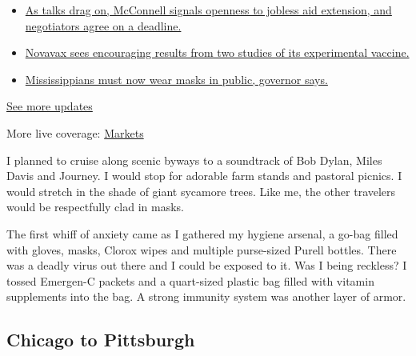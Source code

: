 \begin{itemize}
\tightlist
\item
  \href{https://www.nytimes.com/2020/08/04/world/coronavirus-cases.html?action=click\&pgtype=Article\&state=default\&region=MAIN_CONTENT_1\&context=storylines_live_updates\#link-762df92}{As
  talks drag on, McConnell signals openness to jobless aid extension,
  and negotiators agree on a deadline.}
\item
  \href{https://www.nytimes.com/2020/08/04/world/coronavirus-cases.html?action=click\&pgtype=Article\&state=default\&region=MAIN_CONTENT_1\&context=storylines_live_updates\#link-1228a480}{Novavax
  sees encouraging results from two studies of its experimental
  vaccine.}
\item
  \href{https://www.nytimes.com/2020/08/04/world/coronavirus-cases.html?action=click\&pgtype=Article\&state=default\&region=MAIN_CONTENT_1\&context=storylines_live_updates\#link-794484ed}{Mississippians
  must now wear masks in public, governor says.}
\end{itemize}

\href{https://www.nytimes.com/2020/08/04/world/coronavirus-cases.html?action=click\&pgtype=Article\&state=default\&region=MAIN_CONTENT_1\&context=storylines_live_updates}{See
more updates}

More live coverage:
\href{https://www.nytimes.com/live/2020/08/04/business/stock-market-today-coronavirus?action=click\&pgtype=Article\&state=default\&region=MAIN_CONTENT_1\&context=storylines_live_updates}{Markets}

I planned to cruise along scenic byways to a soundtrack of Bob Dylan,
Miles Davis and Journey. I would stop for adorable farm stands and
pastoral picnics. I would stretch in the shade of giant sycamore trees.
Like me, the other travelers would be respectfully clad in masks.

The first whiff of anxiety came as I gathered my hygiene arsenal, a
go-bag filled with gloves, masks, Clorox wipes and multiple purse-sized
Purell bottles. There was a deadly virus out there and I could be
exposed to it. Was I being reckless? I tossed Emergen-C packets and a
quart-sized plastic bag filled with vitamin supplements into the bag. A
strong immunity system was another layer of armor.

\hypertarget{chicago-to-pittsburgh}{%
\subsection{Chicago to Pittsburgh}\label{chicago-to-pittsburgh}}

